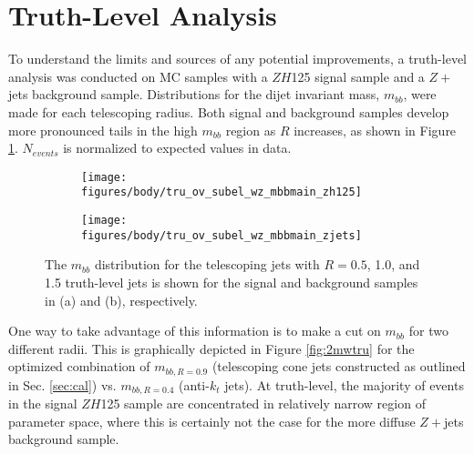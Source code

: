 \section{Truth-Level Analysis}
\label{sec:tru}
To understand the limits and sources of any potential improvements, a truth-level analysis was conducted on MC samples with a $ZH$125 signal sample and a $Z+$jets background sample. Distributions for the dijet invariant mass, $m_{bb}$, were made for each telescoping radius.%
  Both signal and background samples develop more pronounced tails in the high $m_{bb}$ region as $R$ increases, as shown in Figure \ref{fig:multradtru}.  $N_{events}$ is normalized to expected values in data.

\begin{figure}[!htbp]\captionsetup{justification=centering}
\begin{center}
\begin{subfigure}[t]{0.49\textwidth}\centering\texttt{[image: figures/body/tru\_ov\_subel\_wz\_mbbmain\_zh125]}\caption{}\end{subfigure}
\begin{subfigure}[t]{0.49\textwidth}\centering\texttt{[image: figures/body/tru\_ov\_subel\_wz\_mbbmain\_zjets]}\caption{}\end{subfigure}
\caption{\label{fig:multradtru}The $m_{bb}$ distribution for the telescoping jets with $R=0.5$, 1.0, and 1.5 truth-level jets is shown for the signal and background samples in (a) and (b), respectively.}
\end{center}
\end{figure}

One way to take advantage of this information is to make a cut on $m_{bb}$ for two different radii.  This is graphically depicted in Figure \ref{fig:2mwtru} for the optimized combination of $m_{bb,R=0.9}$ (telescoping cone jets constructed as outlined in Sec. \ref{sec:cal}) vs. $m_{bb,R=0.4}$ (anti-$k_t$ jets).  At truth-level, the majority of events in the signal $ZH$125 sample are concentrated in relatively narrow region of parameter space, where this is certainly not the case for the more diffuse $Z+$jets background sample.

